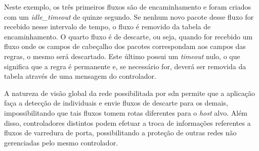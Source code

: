 \begin{table}[H]
\centering
\caption{Exemplo de fluxos na tabela de encaminhamento.}
\end{table}

Neste exemplo, os três primeiros fluxos são de encaminhamento e foram criados com um \textit{idle\_timeout} de quinze segundo. Se nenhum novo pacote desse fluxo for recebido nesse intervalo de tempo, o fluxo é removido da tabela de encaminhamento. O quarto fluxo é de descarte, ou seja, quando for recebido um fluxo onde os campos de cabeçalho dos pacotes correspondam aos campos das regras, o mesmo será descartado. Este último possui um \textit{timeout} nulo, o que significa que a regra é permanente e, se necessário for, deverá ser removida da tabela através de uma mensagem do controlador.

A natureza de visão global da rede possibilitada por \gls{sdn} permite que a aplicação faça a detecção de  individuais e envie fluxos de descarte para os demais, impossibilitando que tais fluxos tomem rotas diferentes para o \textit{host} alvo. Além disso, controladores distintos podem efetuar a troca de informações referentes a fluxos de varredura de porta, possibilitando a proteção de outras redes não gerenciadas pelo mesmo controlador.








